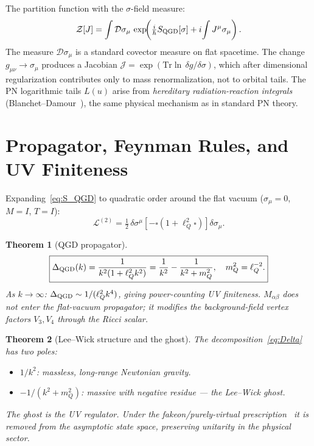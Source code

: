 \documentclass[11pt,a4paper]{article}
\theoremstyle{plain}
\newtheorem{theorem}{Theorem}[section]
\theoremstyle{definition}
\theoremstyle{remark}
\newcommand{\lQ}{\ell_Q}
\newcommand{\mQ}{m_Q}
\newcommand{\half}{\tfrac{1}{2}}
\newcommand{\Dg}{\mathcal{D}}
\begin{document}
The partition function with the $\sigma$-field measure:
\begin{equation}
  \mathcal{Z}[J] = \int\Dg\sigma_\mu\,
    \exp\!\!\left(\tfrac{i}{\hbar}S_{\rm QGD}[\sigma]
    + i\!\int J^\mu\sigma_\mu\right).
  \label{eq:Z}
\end{equation}
The measure $\Dg\sigma_\mu$ is a standard covector measure on flat
spacetime.  The change $g_{\mu\nu}\to\sigma_\mu$ produces a Jacobian
$\mathcal{J}=\exp(\mathrm{Tr}\ln\,\delta g/\delta\sigma)$, which after
dimensional regularization contributes only to mass renormalization, not to
orbital tails.  The PN logarithmic tails $L(u)$ arise from
\emph{hereditary radiation-reaction integrals} (Blanchet--Damour~\cite{Blanchet1986}),
the same physical mechanism as in standard PN theory.

\section{Propagator, Feynman Rules, and UV Finiteness}
\label{sec:Feynman}

Expanding~\eqref{eq:S_QGD} to quadratic order around the flat vacuum
($\sigma_\mu=0$, $M=I$, $T=I$):
\begin{equation}
  \mathcal{L}^{(2)} = \half\,\delta\sigma^\mu\!
    \left[-\square(1+\lQ^2\square)\right]\!\delta\sigma_\mu.
  \label{eq:L2}
\end{equation}

\begin{theorem}[QGD propagator]\label{thm:prop}
\begin{equation}
  \boxed{\Delta_{\rm QGD}(k) = \frac{1}{k^2(1+\lQ^2 k^2)}
    = \frac{1}{k^2} - \frac{1}{k^2+\mQ^2},\quad \mQ^2=\lQ^{-2}.}
  \label{eq:Delta}
\end{equation}
As $k\to\infty$: $\Delta_{\rm QGD}\sim1/(\lQ^2 k^4)$, giving
power-counting UV finiteness.
$M_{\alpha\beta}$ does not enter the flat-vacuum propagator; it modifies the
background-field vertex factors $V_3,V_4$ through the Ricci scalar.
\end{theorem}

\begin{theorem}[Lee--Wick structure and the ghost]\label{thm:LW}
The decomposition~\eqref{eq:Delta} has two poles:
\begin{itemize}[noitemsep]
  \item $1/k^2$: massless, long-range Newtonian gravity.
  \item $-1/(k^2+\mQ^2)$: massive with \emph{negative residue} ---
    the Lee--Wick ghost.
\end{itemize}
The ghost is the UV regulator.  Under the fakeon/purely-virtual
prescription~\cite{Anselmi2018} it is removed from the asymptotic
state space, preserving unitarity in the physical sector.
\end{theorem}
\end{document}
